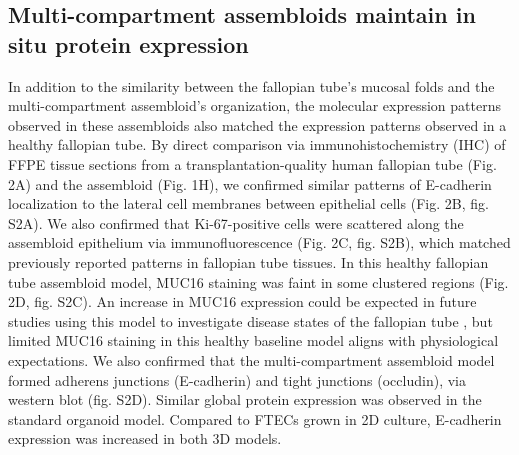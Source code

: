 \begin{refsection}
    \subsection{Multi-compartment assembloids maintain in situ protein expression}
    In addition to the similarity between the fallopian tube’s mucosal folds and the multi-compartment assembloid’s organization, the molecular expression patterns observed in these assembloids also matched the expression patterns observed in a healthy fallopian tube. By direct comparison via immunohistochemistry (IHC) of FFPE tissue sections from a transplantation-quality human fallopian tube (Fig. 2A) and the assembloid (Fig. 1H), we confirmed similar patterns of E-cadherin localization to the lateral cell membranes between epithelial cells (Fig. 2B, fig. S2A). We also confirmed that Ki-67-positive cells were scattered along the assembloid epithelium via immunofluorescence (Fig. 2C, fig. S2B), which matched previously reported patterns in fallopian tube tissues\cite{kessler2015a}. In this healthy fallopian tube assembloid model, MUC16 staining was faint in some clustered regions (Fig. 2D, fig. S2C). An increase in MUC16 expression could be expected in future studies using this model to investigate disease states of the fallopian tube \cite{bast2009a,aithal2018a}, but limited MUC16 staining in this healthy baseline model aligns with physiological expectations. 
    We also confirmed that the multi-compartment assembloid model formed adherens junctions (E-cadherin)\cite{stockinger2001a,soler1999a,bajpai2008a} and tight junctions (occludin)\cite{cummins2012a}, via western blot (fig. S2D). Similar global protein expression was observed in the standard organoid model. Compared to FTECs grown in 2D culture, E-cadherin expression was increased in both 3D models. 

\end{refsection}
